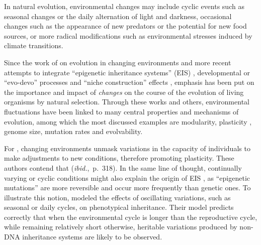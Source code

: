 In natural evolution, environmental changes may include cyclic events such as seasonal changes or the daily alternation of light and darkness, occasional changes such as the appearance of new predators or the potential for new food sources, or more radical modifications such as environmental stresses induced by climate transitions.

Since the work of \citet{levins1968evolution} on evolution in changing environments and more recent attempts to integrate ``epigenetic inheritance systems'' (EIS) \citep{jablonka2014evolution}, developmental or ``evo-devo'' processes \citep{muller2007evodevoextendingtheevolutionarysynthesis} and ``niche construction'' effects \citep{laland2016anintroductiontonicheconstructiontheory}, emphasis has been put on the importance and impact of \emph{changes} on the course of the evolution of living organisms by natural selection. Through these works and others, environmental fluctuations have been linked to many central properties and mechanisms of evolution, among which the most discussed examples are modularity, plasticity \citep{west2005developmental}, genome size, mutation rates and evolvability.

For \citet{jablonka2014evolution}, changing environments unmask variations in the capacity of individuals to make adjustments to new conditions, therefore promoting plasticity. These authors contend that  (\emph{ibid.},~p.~318). In the same line of thought, continually varying or cyclic conditions might also explain the origin of EIS \citep{heard2014transgenerationalepigeneticinheritancemythsandmechanisms}, as ``epigenetic mutations'' are more reversible and occur more frequently than genetic ones. To illustrate this notion, \citet{lachmann1996inheritance} modeled the effects of oscillating variations, such as seasonal or daily cycles, on phenotypical inheritance. Their model predicts correctly that when the environmental cycle is longer than the reproductive cycle, while remaining relatively short otherwise, heritable variations produced by non-DNA inheritance systems are likely to be observed. 


